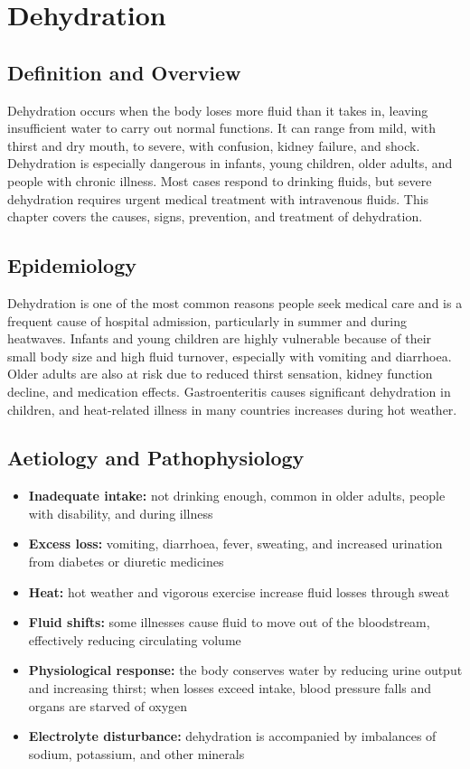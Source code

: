 \chapter{Dehydration}

\section*{Definition and Overview}
Dehydration occurs when the body loses more fluid than it takes in, leaving insufficient water to carry out normal functions. It can range from mild, with thirst and dry mouth, to severe, with confusion, kidney failure, and shock. Dehydration is especially dangerous in infants, young children, older adults, and people with chronic illness. Most cases respond to drinking fluids, but severe dehydration requires urgent medical treatment with intravenous fluids. This chapter covers the causes, signs, prevention, and treatment of dehydration.

\section*{Epidemiology}
Dehydration is one of the most common reasons people seek medical care and is a frequent cause of hospital admission, particularly in summer and during heatwaves. Infants and young children are highly vulnerable because of their small body size and high fluid turnover, especially with vomiting and diarrhoea. Older adults are also at risk due to reduced thirst sensation, kidney function decline, and medication effects. Gastroenteritis causes significant dehydration in children, and heat-related illness in many countries increases during hot weather.

\section*{Aetiology and Pathophysiology}
\begin{itemize}
    \item \textbf{Inadequate intake:} not drinking enough, common in older adults, people with disability, and during illness
    \item \textbf{Excess loss:} vomiting, diarrhoea, fever, sweating, and increased urination from diabetes or diuretic medicines
    \item \textbf{Heat:} hot weather and vigorous exercise increase fluid losses through sweat
    \item \textbf{Fluid shifts:} some illnesses cause fluid to move out of the bloodstream, effectively reducing circulating volume
    \item \textbf{Physiological response:} the body conserves water by reducing urine output and increasing thirst; when losses exceed intake, blood pressure falls and organs are starved of oxygen
    \item \textbf{Electrolyte disturbance:} dehydration is accompanied by imbalances of sodium, potassium, and other minerals
\end{itemize}

